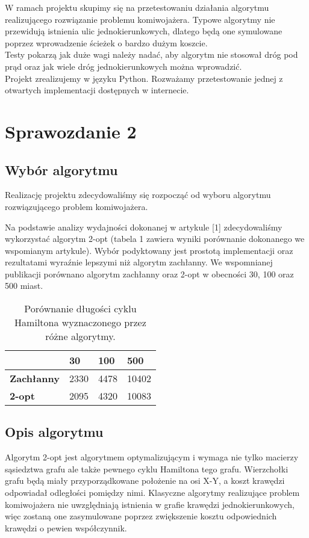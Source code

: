 \documentclass{article}
\begin{document}
W ramach projektu skupimy się na przetestowaniu działania algorytmu realizującego rozwiązanie problemu komiwojażera. Typowe algorytmy nie przewidują istnienia ulic jednokierunkowych, dlatego będą one symulowane poprzez wprowadzenie ścieżek o bardzo dużym koszcie.
\\

Testy pokarzą jak duże wagi należy nadać, aby algorytm nie stosował dróg pod prąd oraz jak wiele dróg jednokierunkowych można wprowadzić.
\\

Projekt zrealizujemy w języku Python. Rozważamy przetestowanie jednej z otwartych implementacji dostępnych w internecie.

\section{Sprawozdanie 2}

\subsection{Wybór algorytmu}
Realizację projektu zdecydowaliśmy się rozpocząć od wyboru algorytmu rozwiązującego problem komiwojażera.

Na podstawie analizy wydajności dokonanej w artykule [1] zdecydowaliśmy wykorzystać algorytm 2-opt (tabela 1 zawiera wyniki porównanie dokonanego we wspomianym artykule). Wybór podyktowany jest prostotą implementacji oraz rezultatami wyraźnie lepszymi niż algorytm zachłanny. We wspomnianej publikacji porównano algorytm zachłanny oraz 2-opt w obecności 30, 100 oraz 500 miast.  \\


\begin{table}[!h]
\centering
\caption{Porównanie długości cyklu Hamiltona wyznaczonego przez różne algorytmy.}
\label{my-label}
\begin{tabular}{|l|l|l|l|}
	\hline
						 & \textbf{30}   & \textbf{100}  & \textbf{500}   \\ \hline
	\textbf{Zachłanny}             & 2330 & 4478 & 10402 \\ \hline
	\textbf{2-opt}                 & 2095 & 4320 & 10083 \\ \hline
\end{tabular}
\end{table}

\subsection{Opis algorytmu}
Algorytm 2-opt jest algorytmem optymalizującym i wymaga nie tylko macierzy sąsiedztwa grafu ale także pewnego cyklu Hamiltona tego grafu. Wierzchołki grafu będą miały przyporządkowane położenie na osi X-Y, a koszt krawędzi odpowiadał odległości pomiędzy nimi. Klasyczne algorytmy realizujące problem komiwojażera nie uwzględniają istnienia w grafie krawędzi jednokierunkowych, więc zostaną one zasymulowane poprzez zwiększenie kosztu odpowiednich krawędzi o pewien współczynnik. \\
\end{document}
